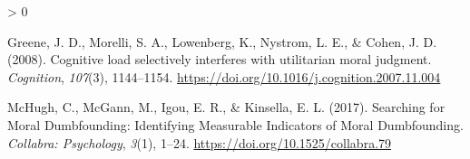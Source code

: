 \documentclass[
  american,
  man]{apa7}
\newlength{\cslhangindent}
\newenvironment{CSLReferences}[2] %
 {%
  \setlength{\parindent}{0pt}
  \ifodd #1 \everypar{\setlength{\hangindent}{\cslhangindent}}\ignorespaces\fi
  \ifnum #2 > 0
  \setlength{\parskip}{#2\baselineskip}
  \fi
 }%
 {}
\begin{document}
\hypertarget{refs}{}
\begin{CSLReferences}{1}{0}
\leavevmode\hypertarget{ref-greene_cognitive_2008}{}%
Greene, J. D., Morelli, S. A., Lowenberg, K., Nystrom, L. E., \& Cohen, J. D. (2008). Cognitive load selectively interferes with utilitarian moral judgment. \emph{Cognition}, \emph{107}(3), 1144--1154. \url{https://doi.org/10.1016/j.cognition.2007.11.004}

\leavevmode\hypertarget{ref-mchugh_searching_2017a}{}%
McHugh, C., McGann, M., Igou, E. R., \& Kinsella, E. L. (2017). Searching for {Moral Dumbfounding}: Identifying {Measurable Indicators} of {Moral Dumbfounding}. \emph{Collabra: Psychology}, \emph{3}(1), 1--24. \url{https://doi.org/10.1525/collabra.79}

\end{CSLReferences}


\clearpage
\renewcommand{\listfigurename}{Figure captions}

\clearpage
\renewcommand{\listtablename}{Table captions}
\end{document}
